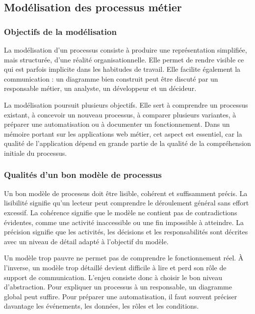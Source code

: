 \subsection{Modélisation des processus métier}

\subsubsection{Objectifs de la modélisation}

La modélisation d'un processus consiste à produire une représentation simplifiée, mais structurée, d'une réalité organisationnelle. Elle permet de rendre visible ce qui est parfois implicite dans les habitudes de travail. Elle facilite également la communication : un diagramme bien construit peut être discuté par un responsable métier, un analyste, un développeur et un décideur.

La modélisation poursuit plusieurs objectifs. Elle sert à comprendre un processus existant, à concevoir un nouveau processus, à comparer plusieurs variantes, à préparer une automatisation ou à documenter un fonctionnement. Dans un mémoire portant sur les applications web métier, cet aspect est essentiel, car la qualité de l'application dépend en grande partie de la qualité de la compréhension initiale du processus.

\subsubsection{Qualités d'un bon modèle de processus}

Un bon modèle de processus doit être lisible, cohérent et suffisamment précis. La lisibilité signifie qu'un lecteur peut comprendre le déroulement général sans effort excessif. La cohérence signifie que le modèle ne contient pas de contradictions évidentes, comme une activité inaccessible ou une fin impossible à atteindre. La précision signifie que les activités, les décisions et les responsabilités sont décrites avec un niveau de détail adapté à l'objectif du modèle.

Un modèle trop pauvre ne permet pas de comprendre le fonctionnement réel. À l'inverse, un modèle trop détaillé devient difficile à lire et perd son rôle de support de communication. L'enjeu consiste donc à choisir le bon niveau d'abstraction. Pour expliquer un processus à un responsable, un diagramme global peut suffire. Pour préparer une automatisation, il faut souvent préciser davantage les événements, les données, les rôles et les conditions.

